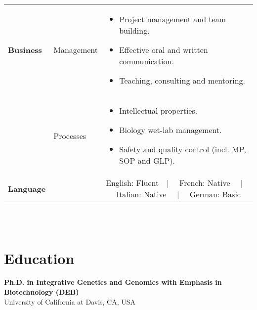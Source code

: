 \documentclass{CV}
\begin{document}
\begin{tabular}{p{} p{} p{}}
\textbf{Business} & 
	Management &
		\begin{itemize}\setlength\itemsep{-0.5em}
		\vspace{-1.8em}
		\item Project management and team building.
		\item Effective oral and written communication.
		\item Teaching, consulting and mentoring.
		\end{itemize}\\
& 
	Processes &
		\begin{itemize}\setlength\itemsep{-0.5em}
		\vspace{-1.8em}
		\item Intellectual properties.
		\item Biology wet-lab management.
		\item Safety and quality control (incl. MP, SOP and GLP).
		\end{itemize}\\
\textbf{Language} && English: Fluent~~|~~ French: Native ~~|~~ Italian: Native ~~|~~ German: Basic\\
\end{tabular}
\\\\






\section*{Education}
\textbf{Ph.D. in  Integrative Genetics and Genomics with Emphasis in Biotechnology (DEB)}  \hfill {}\\
University of California at Davis, CA, USA\\
\end{document}

